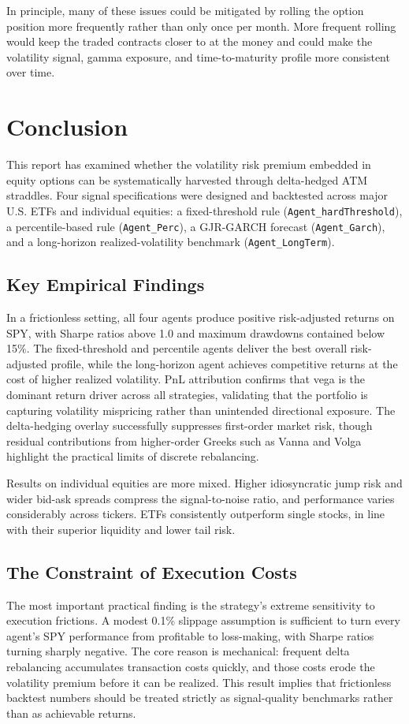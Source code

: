 ﻿\documentclass{article}
\begin{document}
In principle, many of these issues could be mitigated by rolling the option position more frequently rather than only once per month. More frequent rolling would keep the traded contracts closer to at the money and could make the volatility signal, gamma exposure, and time-to-maturity profile more consistent over time.


\section{Conclusion}
This report has examined whether the volatility risk premium embedded in equity options can be systematically harvested through delta-hedged ATM straddles. Four signal specifications were designed and backtested across major U.S. ETFs and individual equities: a fixed-threshold rule (\texttt{Agent\_hardThreshold}), a percentile-based rule (\texttt{Agent\_Perc}), a GJR-GARCH forecast (\texttt{Agent\_Garch}), and a long-horizon realized-volatility benchmark (\texttt{Agent\_LongTerm}).

\subsection{Key Empirical Findings}
In a frictionless setting, all four agents produce positive risk-adjusted returns on SPY, with Sharpe ratios above 1.0 and maximum drawdowns contained below 15\%. The fixed-threshold and percentile agents deliver the best overall risk-adjusted profile, while the long-horizon agent achieves competitive returns at the cost of higher realized volatility. PnL attribution confirms that vega is the dominant return driver across all strategies, validating that the portfolio is capturing volatility mispricing rather than unintended directional exposure. The delta-hedging overlay successfully suppresses first-order market risk, though residual contributions from higher-order Greeks such as Vanna and Volga highlight the practical limits of discrete rebalancing.

Results on individual equities are more mixed. Higher idiosyncratic jump risk and wider bid-ask spreads compress the signal-to-noise ratio, and performance varies considerably across tickers. ETFs consistently outperform single stocks, in line with their superior liquidity and lower tail risk.

\subsection{The Constraint of Execution Costs}
The most important practical finding is the strategy's extreme sensitivity to execution frictions. A modest 0.1\% slippage assumption is sufficient to turn every agent's SPY performance from profitable to loss-making, with Sharpe ratios turning sharply negative. The core reason is mechanical: frequent delta rebalancing accumulates transaction costs quickly, and those costs erode the volatility premium before it can be realized. This result implies that frictionless backtest numbers should be treated strictly as signal-quality benchmarks rather than as achievable returns.
\end{document}
